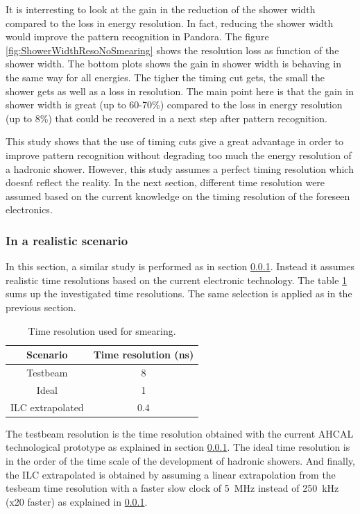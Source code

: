 It is interresting to look at the gain in the reduction of the shower width compared to the loss in energy resolution. In fact, reducing the shower width would improve the pattern recognition in Pandora. The figure \ref{fig:ShowerWidthResoNoSmearing} shows the resolution loss as function of the shower width. The bottom plots shows the gain in shower width is behaving in the same way for all energies. The tigher the timing cut gets, the small the shower gets as well as a loss in resolution. The main point here is that the gain in shower width is great (up to 60-70\%) compared to the loss in energy resolution (up to 8\%) that could be recovered in a next step after pattern recognition.

This study shows that the use of timing cuts give a great advantage in order to improve pattern recognition without degrading too much the energy resolution of a hadronic shower. However, this study assumes a perfect timing resolution which doesn\'t reflect the reality. In the next section, different time resolution were assumed based on the current knowledge on the timing resolution of the foreseen electronics.

\subsubsection{In a realistic scenario}

In this section, a similar study is performed as in section \ref{}. Instead it assumes realistic time resolutions based on the current electronic technology. The table \ref{table:TimeReso} sums up the investigated time resolutions. The same selection is applied as in the previous section.

\begin{table}[htb!]
  \centering
  \caption{Time resolution used for smearing.} \label{table:TimeReso}
  \begin{tabular}{|c|c|}
    \hline
    Scenario & Time resolution (ns) \\
    \hline
    Testbeam & 8 \\
    Ideal & 1 \\
    ILC extrapolated & 0.4 \\
    \hline
  \end{tabular}
\end{table}

The testbeam resolution is the time resolution obtained with the current AHCAL technological prototype as explained in section \ref{}. The ideal time resolution is in the order of the time scale of the development of hadronic showers. And finally, the ILC extrapolated is obtained by assuming a linear extrapolation from the tesbeam time resolution with a faster slow clock of \SI{5}{\mega\hertz} instead of \SI{250}{\kilo\hertz} (x20 faster) as explained in \ref{}.\\

